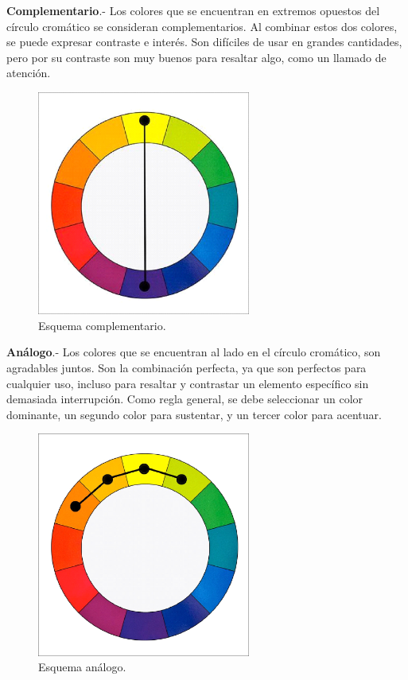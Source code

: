\textbf{Complementario}.- Los colores que se encuentran en extremos opuestos del círculo cromático se consideran complementarios. Al combinar estos dos colores, se puede expresar contraste e interés. Son difíciles de usar en grandes cantidades, pero por su contraste son muy buenos para resaltar algo, como un llamado de atención.
\begin{figure}[h!]
	\centering
	\includegraphics[width=7cm]{imagenes/marcoteorico/disenointeriores/complementario.png}
	\caption{Esquema complementario.\cite{B13}}
	\label{fig:complementario}
\end{figure}

\textbf{Análogo}.- Los colores que se encuentran al lado en el círculo cromático, son agradables juntos. Son la combinación perfecta, ya que son perfectos para cualquier uso, incluso para resaltar y contrastar un elemento específico sin demasiada interrupción. Como regla general, se debe seleccionar un color dominante, un segundo color para sustentar, y un tercer color para acentuar.\cite{B13}
\begin{figure}[h!]
	\centering
	\includegraphics[width=7cm]{imagenes/marcoteorico/disenointeriores/analogo.png}
	\caption{Esquema análogo.\cite{B13}}
	\label{fig:analogo}
\end{figure}


\par 
